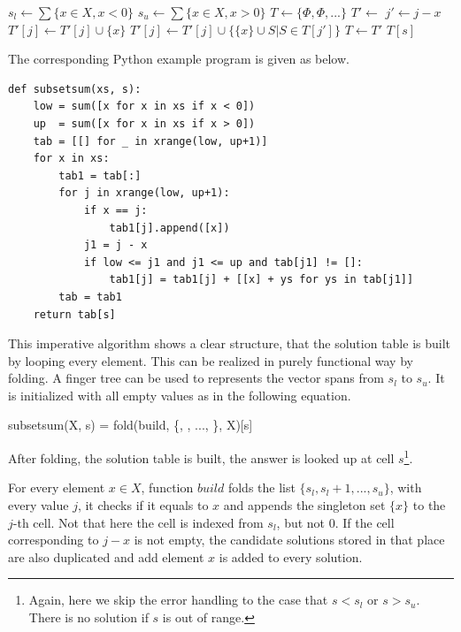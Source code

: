 \documentclass[UTF8]{article}
\begin{document}
\begin{algorithmic}[1]
  \State $s_l \gets \sum \{x \in X, x < 0\}$
  \State $s_u \gets \sum \{x \in X, x > 0\}$
  \State $T \gets \{\Phi, \Phi, ...\}$ 
    \State $T' \gets$ 
      \State $j' \gets j - x$
        \State $T'[j] \gets T'[j] \cup \{x\}$
      \EndIf
        \State $T'[j] \gets T'[j] \cup \{\{x\} \cup S | S \in T[j']\}$
      \EndIf
    \EndFor
    \State $T \gets T'$
  \EndFor
  \State \Return $T[s]$
\EndFunction
\end{algorithmic}

The corresponding Python example program is given as below.

\lstset{language=Python}
\begin{lstlisting}
def subsetsum(xs, s):
    low = sum([x for x in xs if x < 0])
    up  = sum([x for x in xs if x > 0])
    tab = [[] for _ in xrange(low, up+1)]
    for x in xs:
        tab1 = tab[:]
        for j in xrange(low, up+1):
            if x == j:
                tab1[j].append([x])
            j1 = j - x
            if low <= j1 and j1 <= up and tab[j1] != []:
                tab1[j] = tab1[j] + [[x] + ys for ys in tab[j1]]
        tab = tab1
    return tab[s]
\end{lstlisting}

This imperative algorithm shows a clear structure, that the solution table is
built by looping every element. This can be realized in purely functional
way by folding. A finger tree can be used to represents the vector spans
from $s_l$ to $s_u$. It is initialized with all empty values as in the following
equation.

\be
subsetsum(X, s) = fold(build, \{\Phi, \Phi, ..., \}, X)[s]
\ee

After folding, the solution table is built, the answer is looked up at
cell $s$\footnote{Again, here we skip the error handling to the case that
$s < s_l$ or $s > s_u$. There is no solution if $s$ is out of range.}.

For every element $x \in X$,
function $build$ folds the list $\{s_l, s_l + 1, ..., s_u\}$, with every
value $j$, it checks if it equals to $x$ and appends the singleton set $\{x\}$
to the $j$-th cell. Not that here the cell is indexed from
$s_l$, but not 0. If the cell corresponding to $j - x$ is not empty,
the candidate solutions stored in that place are also duplicated and
add element $x$ is added to every solution.
\end{document}
